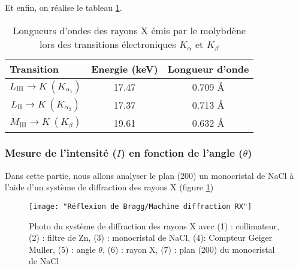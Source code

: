 \newpage
Et enfin, on réalise le tableau \ref{tab: Transition nergitique en les diffrentes couche du molybdne et les diffrentes longueurs donde misse par les transitions}. 
\begin{table}[h!]
	\centering
	\begin{tabular}{|c|c|c|}
		\hline
		\multicolumn{1}{|l|}{\textbf{Transition}} & \multicolumn{1}{l|}{\textbf{Energie (keV)}} & \multicolumn{1}{l|}{\textbf{Longueur d'onde}} \\ \hline
		$L_{\mathrm{III}} \to K \ (K_{\alpha_1}) $                    & 17.47                                       & 0.709 \AA                                       \\ \hline
		$L_{\mathrm{II}} \to K \ (K_{\alpha_2}) $                      & 17.37                                       & 0.713 \AA                                       \\ \hline
		$M_{\mathrm{III}} \to K \ (K_{\beta}) $                         & 19.61                                       & 0.632 \AA                                       \\ \hline
	\end{tabular}
	\caption{\centering Longueurs d'ondes des rayons X émis par le molybdène lors des transitions électroniques $K_{\alpha}$ et $K_{\beta}$}
	\label{tab: Transition nergitique en les diffrentes couche du molybdne et les diffrentes longueurs donde misse par les transitions}
\end{table}





\subsubsection{Mesure de l’intensité ($I$) en fonction de l’angle ($\theta$)}
Dans cette partie, nous allons analyser le plan (200) un monocristal de NaCl à l'aide d'un système de diffraction des rayons X (figure \ref{fig:machine-diffraction-rx})

\begin{figure}[h!]
	\centering
	\texttt{[image: "Réflexion de Bragg/Machine diffraction RX"]}
	\caption{\centering Photo du système de diffraction des rayons X avec (1) : collimateur, (2) : filtre de Zn, (3) : monocristal de NaCl, (4): Compteur Geiger Muller, (5) : angle $\theta$, (6) : rayon X, (7) : plan (200) du monocristal de NaCl }
	\label{fig:machine-diffraction-rx}
\end{figure}



